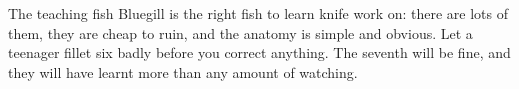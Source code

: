 \begin{telospanel}{The teaching fish}
Bluegill is the right fish to learn knife work on: there are lots of them, they are cheap to ruin, and the anatomy is simple and obvious. Let a teenager fillet six badly before you correct anything. The seventh will be fine, and they will have learnt more than any amount of watching.
\end{telospanel}



\advisorypanfish

